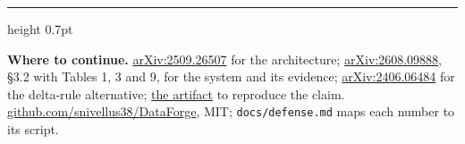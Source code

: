 \documentclass[a4paper,9pt]{extarticle}
\newcommand{\arx}[1]{\href{https://arxiv.org/abs/#1}{arXiv:#1}}
\begin{document}
\vspace{-0.2ex}
{\color{rule}\hrule height 0.7pt}
\vspace{0.4ex}
{\fontsize{6.6}{8}\selectfont\color{mid}\textbf{Where to continue.} \arx{2509.26507} for the
architecture; \arx{2608.09888}, \S3.2 with Tables 1, 3 and 9, for the system and its evidence;
\arx{2406.06484} for the delta-rule alternative;
\href{https://demonstrations-are-weights.vercel.app}{the artifact} to reproduce the claim.
\href{https://github.com/snivellus38/DataForge}{github.com/snivellus38/DataForge}, MIT;
\texttt{docs/defense.md} maps each number to its script.\par}
\end{document}

